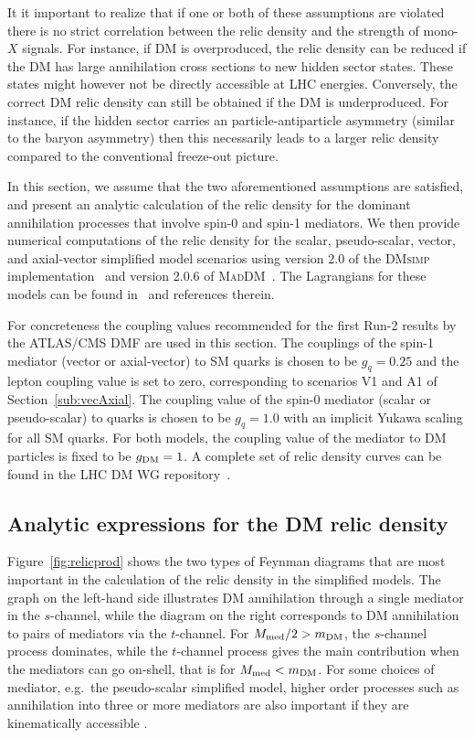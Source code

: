 \documentclass[a4paper, 11pt,notoc]{article}
\newcommand{\dmsimp}{\textsc{DMsimp}\xspace}
\newcommand{\maddm}{\textsc{MadDM}\xspace}
\begin{document}
It it important to realize that if one or both of these assumptions are violated there is no strict correlation between the relic density and the strength of mono-$X$ signals. For instance, if DM is overproduced, the relic density can be reduced if the DM has large annihilation cross sections to new hidden sector states. These states might however not be directly accessible at LHC energies.  Conversely, the correct DM relic density can still be obtained  if the DM is underproduced. For instance, if the hidden sector carries an particle-antiparticle asymmetry (similar to the baryon asymmetry) then this necessarily leads to a larger relic density compared to the conventional freeze-out picture. 

In this section, we assume that the two aforementioned assumptions are satisfied, and  present an analytic calculation of the relic density for the dominant annihilation processes that involve spin-0 and spin-1 mediators. We then provide numerical computations of the relic density for the  scalar, pseudo-scalar, vector, and axial-vector simplified model scenarios using version 2.0 of the \dmsimp implementation~\cite{DMsimp}
and version 2.0.6 of \maddm~\cite{Backovic:2013dpa,Backovic:2015tpt}. The Lagrangians for these models can be found in~\cite{Boveia:2016mrp} and references therein. 

For concreteness  the coupling values recommended for the first Run-2 results by the ATLAS/CMS DMF are used in this section. The couplings of the spin-1 mediator (vector or axial-vector) to SM quarks is chosen to be $g_q = 0.25$ and the lepton coupling value is set to zero, corresponding to scenarios V1 and A1 of Section~\ref{sub:vecAxial}. The coupling value of the spin-0 mediator (scalar or pseudo-scalar) to quarks is chosen to be $g_q=1.0$ with an implicit Yukawa scaling for all SM quarks. For both models, the coupling value of the mediator to DM particles is fixed to be $g_{\rm DM}=1$.
A complete set of relic density curves can be found in the LHC DM WG repository~\cite{RelicRepo}.

\subsection{Analytic expressions for the DM relic density}
\label{analyticrelic}

Figure~\ref{fig:relicprod} shows the two  
types of Feynman diagrams that are 
most important in the calculation of the relic density in the simplified models. The graph on the left-hand side illustrates DM annihilation through a single mediator in the $s$-channel, while the diagram on the right corresponds to DM annihilation to pairs of mediators via the $t$-channel.
For $M_{\rm med}/2 > m_{\rm DM}$, the $s$-channel process dominates, while the $t$-channel process gives the main contribution when the mediators can go on-shell, that is for $M_{\rm med} < m_{\rm DM}$. For some choices of mediator, e.g.~the pseudo-scalar simplified model, higher
order processes such as annihilation into three or
more mediators are also important if they are kinematically accessible \cite{Abdullah:2014lla}.
\end{document}
